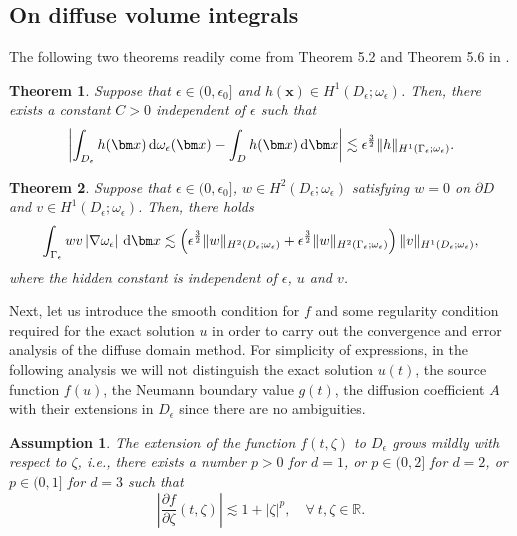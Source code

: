 \documentclass[3p,times]{elsarticle}
\newtheorem{theorem}{Theorem}[section]
\newtheorem{assumption}{Assumption}[section]
\numberwithin{equation}{section}
\newcommand{\dd}{\,{\rm d}}
\begin{document}
\subsection{On diffuse volume integrals}

The following two theorems readily come from Theorem 5.2 and Theorem 5.6 in \cite{BurgerElvetun2017}.

\begin{theorem}
	\label{thm1}
	Suppose that $\epsilon\in (0, \epsilon_0]$ and  $h(\bm x) \in H^1(D_{\epsilon};\omega_{\epsilon})$. Then, there exists a constant $C>0$ independent of $\epsilon$ such that
	\begin{equation*}
		\left|\int_{D_{\epsilon}} h(\bm x)\dd \omega_{\epsilon}(\bm x)-\int_D h(\bm x)\dd \bm x \right| \lesssim \epsilon^{\frac 3 2}\|h\|_{H^1(\Gamma_{\epsilon};\omega_{\epsilon})}.
	\end{equation*}
\end{theorem}

\begin{theorem}
	\label{thm2}
	Suppose that  $\epsilon\in (0, \epsilon_0]$, $w \in H^2(D_{\epsilon};\omega_{\epsilon})$ satisfying $w=0$ on $\partial D$ and  $v \in H^1(D_{\epsilon};\omega_{\epsilon})$. Then, there holds
	\begin{equation*}
		\int_{\Gamma_{\epsilon}} wv\left|\nabla \omega_{\epsilon}\right|\dd \bm x \lesssim \left(\epsilon^{\frac 3 2}\|w\|_{H^2(D_{\epsilon};\omega_{\epsilon})}+\epsilon^{\frac 3 2}\|w\|_{H^2(\Gamma_{\epsilon};\omega_{\epsilon})}\right)\|v\|_{H^1(D_{\epsilon};\omega_{\epsilon})},
	\end{equation*}
	where the hidden constant is independent of $\epsilon$, $u$ and $v$.
\end{theorem}

Next, let us introduce the smooth condition for  $f$ and some regularity condition required for the exact solution $u$ in order to carry out the convergence and error analysis of the diffuse domain method. For simplicity of expressions, in the following analysis we will not distinguish the exact solution $u(t)$, the source function $f(u)$, the Neumann  boundary value $g(t)$, the diffusion coefficient $A$ with their extensions  in $D_\epsilon$ since there are no ambiguities.

\begin{assumption}
	\label{mild_growth}
	The extension of the function $f(t,\zeta)$ to $D_{\epsilon}$ grows mildly with respect to $\zeta$, i.e., there exists a number $p>0$ for $d=1$, or $p\in (0, 2]$ for $d=2$, or $p\in (0,1]$ for $d=3$ such that
	\begin{equation}
		\label{mild_growth_eq}
		\left|\frac{\partial f}{\partial \zeta}(t,\zeta)\right|\lesssim 1+|\zeta|^p,\quad \forall\ t, \zeta \in \mathbb{R}.
	\end{equation}
\end{assumption}
\end{document}
